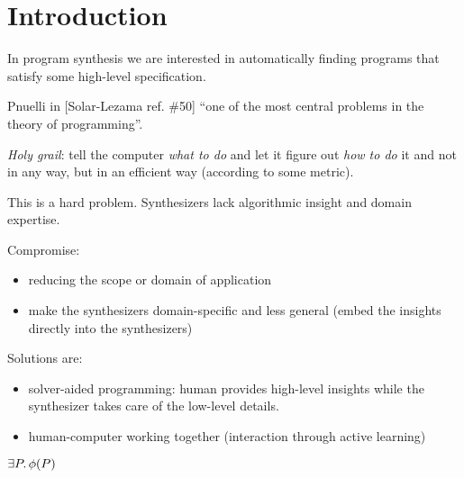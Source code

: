 \chapter{Introduction}
\label{chapter:introduction}

In program synthesis we are interested in automatically finding programs that
satisfy some high-level specification.

Pnuelli in [Solar-Lezama ref. \#50] ``one of the most central problems in the
theory of programming''.

\textit{Holy grail}: tell the computer \textit{what to do} and let it figure out
\textit{how to do} it and not in any way, but in an efficient way (according to
some metric).

This is a hard problem. Synthesizers lack algorithmic insight and domain
expertise.

Compromise:

\begin{itemize}
\item reducing the scope or domain of application
\item make the synthesizers domain-specific and less general (embed the insights
  directly into the synthesizers)
\end{itemize}

Solutions are:

\begin{itemize}
\item solver-aided programming: human provides high-level insights while the
synthesizer takes care of the low-level details.
\item human-computer working together (interaction through active learning)
\end{itemize}


$\exists P \ldotp \phi(P) $







